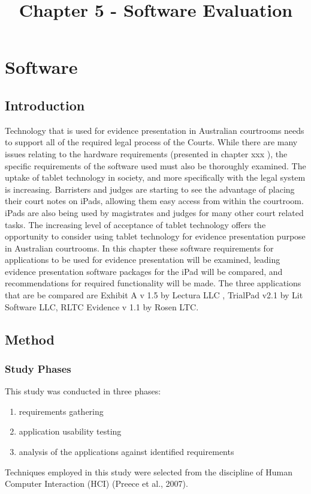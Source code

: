 


\chapter{Software }

\title{Chapter 5 - Software Evaluation}

\maketitle
\section{Introduction}
\doublespace
Technology that is used for evidence presentation in Australian courtrooms needs to support all of the required legal process of the Courts. While there are many issues relating to the hardware requirements (presented in chapter
\color{red} xxx 
\color{black} ), the specific requirements of the software used must also be thoroughly examined. The uptake of tablet technology in society, and more specifically with the legal system is increasing.
Barristers and judges are starting to see the advantage of placing their court notes on iPads, allowing them easy access from within the courtroom. iPads are also being used by magistrates and judges for many other court related tasks. The increasing level of acceptance of tablet technology offers the opportunity to consider using tablet technology for evidence presentation purpose in Australian courtrooms.
In this chapter these software requirements for applications to be used for evidence presentation will be examined, leading evidence presentation software packages for the iPad will be compared, and recommendations for required functionality will be made.
The three applications that are be compared are Exhibit A v 1.5 by Lectura LLC ,  TrialPad v2.1 by Lit Software LLC, RLTC Evidence v 1.1 by Rosen LTC.


\section{Method}
\subsection{Study Phases}
This study was conducted in three phases:
\begin{enumerate}
    \item requirements gathering
    \item application usability testing
    \item analysis of the applications against identified requirements
\end{enumerate} 
Techniques employed in this study were selected from the discipline of Human Computer Interaction (HCI) \color{green}(Preece et al., 2007).
\color{black}
